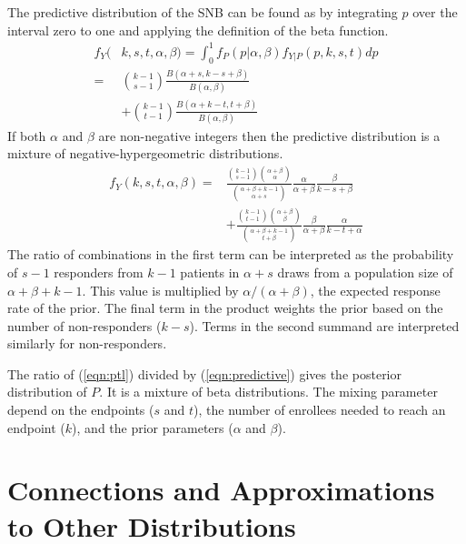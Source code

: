\documentclass[sii]{ipart}
\begin{document}
The predictive distribution of the SNB can be found as by integrating
$p$ over the interval zero to one and applying the definition of the 
beta function.
\begin{align} \label{eqn:predictive}
f_{Y}(&k, s, t, \alpha, \beta) = 
  \int_0^1 f_P(p | \alpha, \beta )  f_{Y|P}(p, k, s, t) dp \\ 
  = & {k-1 \choose s-1} \frac{B\left(\alpha+s, k-s+\beta \right)}{B(\alpha, \beta)} 
     \nonumber \\
  & + {k-1 \choose t-1} 
    \frac{B\left(\alpha + k - t, t+\beta\right)}{B(\alpha, \beta)} \nonumber
\end{align}
If both $\alpha$ and $\beta$ are non-negative integers then the predictive
distribution is a mixture of negative-hypergeometric distributions. 
\begin{align*} \label{eqn:hypergeo}
f_{Y}(k, s, t, \alpha, \beta) = & 
  \frac{ {k - 1 \choose s - 1 } 
         {\alpha + \beta \choose \alpha} }{
         {\alpha + \beta + k - 1 \choose \alpha + s}}
  \frac{\alpha}{\alpha + \beta}
  \frac{ \beta }{ k-s+\beta } \\ & +
  \frac{ {k - 1 \choose t - 1} 
         {\alpha + \beta \choose \beta} 
         }{
         {\alpha + \beta + k -1 \choose t + \beta}
       }
  \frac{ \beta }{ \alpha + \beta}
  \frac{ \alpha }{ k-t + \alpha}
\end{align*}
The ratio of combinations in the first term can be interpreted as the
probability of $s-1$ responders from $k-1$ patients in $\alpha + s$ draws
from a population size of $\alpha + \beta + k - 1$. This value is multiplied
by $\alpha / (\alpha + \beta)$, the expected response rate of the prior. 
The final term in the product weights the prior based on the number
of non-responders ($k-s$). Terms in the second summand are interpreted similarly
for non-responders.

The ratio of (\ref{eqn:ptl}) divided by (\ref{eqn:predictive}) gives the 
posterior distribution of $P$. It is a mixture of beta distributions. The
mixing parameter depend on the endpoints ($s$ and $t$), the number of enrollees needed to reach an endpoint ($k$), and the prior parameters ($\alpha$ and
$\beta$).


\section{Connections and Approximations to Other Distributions}
\end{document}

